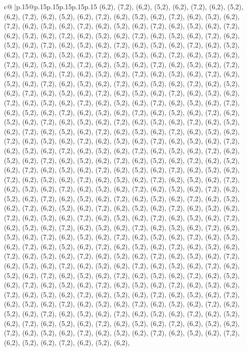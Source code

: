 \documentclass{article}
\begin{document}
{\begin{supertabular}{c@{$\;$}|p{.15\linewidth}@{}p{.15\linewidth}p{.15\linewidth}p{.15\linewidth}p{.15\linewidth}p{.15\linewidth}}
{{{(6,2), (7,2), (6,2), (5,2), (6,2), (7,2), (6,2), (5,2), (6,2), (7,2), (6,2), (5,2), (6,2), (7,2), (6,2), (5,2), (6,2), (7,2), (6,2), (5,2), (6,2), (7,2), (6,2), (5,2), (6,2), (7,2), (6,2), (5,2), (6,2), (7,2), (6,2), (5,2), (6,2), (7,2), (6,2), (5,2), (6,2), (7,2), (6,2), (5,2), (6,2), (7,2), (6,2), (5,2), (6,2), (7,2), (6,2), (5,2), (6,2), (7,2), (6,2), (5,2), (6,2), (7,2), (6,2), (5,2), (6,2), (7,2), (6,2), (5,2), (6,2), (7,2), (6,2), (5,2), (6,2), (7,2), (6,2), (5,2), (6,2), (7,2), (6,2), (5,2), (6,2), (7,2), (6,2), (5,2), (6,2), (7,2), (6,2), (5,2), (6,2), (7,2), (6,2), (5,2), (6,2), (7,2), (6,2), (5,2), (6,2), (7,2), (6,2), (5,2), (6,2), (7,2), (6,2), (5,2), (6,2), (7,2), (6,2), (5,2), (6,2), (7,2), (6,2), (5,2), (6,2), (7,2), (6,2), (5,2), (6,2), (7,2), (6,2), (5,2), (6,2), (7,2), (6,2), (5,2), (6,2), (7,2), (6,2), (5,2), (6,2), (7,2), (6,2), (5,2), (6,2), (7,2), (6,2), (5,2), (6,2), (7,2), (6,2), (5,2), (6,2), (7,2), (6,2), (5,2), (6,2), (7,2), (6,2), (5,2), (6,2), (7,2), (6,2), (5,2), (6,2), (7,2), (6,2), (5,2), (6,2), (7,2), (6,2), (5,2), (6,2), (7,2), (6,2), (5,2), (6,2), (7,2), (6,2), (5,2), (6,2), (7,2), (6,2), (5,2), (6,2), (7,2), (6,2), (5,2), (6,2), (7,2), (6,2), (5,2), (6,2), (7,2), (6,2), (5,2), (6,2), (7,2), (6,2), (5,2), (6,2), (7,2), (6,2), (5,2), (6,2), (7,2), (6,2), (5,2), (6,2), (7,2), (6,2), (5,2), (6,2), (7,2), (6,2), (5,2), (6,2), (7,2), (6,2), (5,2), (6,2), (7,2), (6,2), (5,2), (6,2), (7,2), (6,2), (5,2), (6,2), (7,2), (6,2), (5,2), (6,2), (7,2), (6,2), (5,2), (6,2), (7,2), (6,2), (5,2), (6,2), (7,2), (6,2), (5,2), (6,2), (7,2), (6,2), (5,2), (6,2), (7,2), (6,2), (5,2), (6,2), (7,2), (6,2), (5,2), (6,2), (7,2), (6,2), (5,2), (6,2), (7,2), (6,2), (5,2), (6,2), (7,2), (6,2), (5,2), (6,2), (7,2), (6,2), (5,2), (6,2), (7,2), (6,2), (5,2), (6,2), (7,2), (6,2), (5,2), (6,2), (7,2), (6,2), (5,2), (6,2), (7,2), (6,2), (5,2), (6,2), (7,2), (6,2), (5,2), (6,2), (7,2), (6,2), (5,2), (6,2), (7,2), (6,2), (5,2), (6,2), (7,2), (6,2), (5,2), (6,2), (7,2), (6,2), (5,2), (6,2), (7,2), (6,2), (5,2), (6,2), (7,2), (6,2), (5,2), (6,2), (7,2), (6,2), (5,2), (6,2), (7,2), (6,2), (5,2), (6,2), (7,2), (6,2), (5,2), (6,2), (7,2), (6,2), (5,2), (6,2), (7,2), (6,2), (5,2), (6,2), (7,2), (6,2), (5,2), (6,2), (7,2), (6,2), (5,2), (6,2), (7,2), (6,2), (5,2), (6,2), (7,2), (6,2), (5,2), (6,2), (7,2), (6,2), (5,2), (6,2), (7,2), (6,2), (5,2), (6,2), (7,2), (6,2), (5,2), (6,2), (7,2), (6,2), (5,2), (6,2), (7,2), (6,2), (5,2), (6,2), (7,2), (6,2), (5,2), (6,2), (7,2), (6,2), (5,2), (6,2), (7,2), (6,2), (5,2), (6,2), (7,2), (6,2), (5,2), (6,2), (7,2), (6,2), (5,2), (6,2), (7,2), (6,2), (5,2), (6,2), (7,2), (6,2), (5,2), (6,2), (7,2), (6,2), (5,2), (6,2), (7,2), (6,2), (5,2), (6,2), (7,2), (6,2), (5,2), (6,2), (7,2), (6,2), (5,2), (6,2), (7,2), (6,2), (5,2), (6,2), (7,2), (6,2), (5,2), (6,2), (7,2), (6,2), (5,2), (6,2), (7,2), (6,2), (5,2), (6,2), (7,2), (6,2), (5,2), (6,2), (7,2), (6,2), (5,2), (6,2), (7,2), (6,2), (5,2), (6,2), (7,2), (6,2), (5,2), (6,2), (7,2), (6,2), (5,2), (6,2), (7,2), (6,2), (5,2), (6,2), (7,2), (6,2), (5,2), (6,2), (7,2), (6,2), (5,2), (6,2), (7,2), (6,2), (5,2), (6,2), (7,2), (6,2), (5,2), (6,2), (7,2), (6,2), (5,2), (6,2), }}}
\end{supertabular}}
\end{document}
